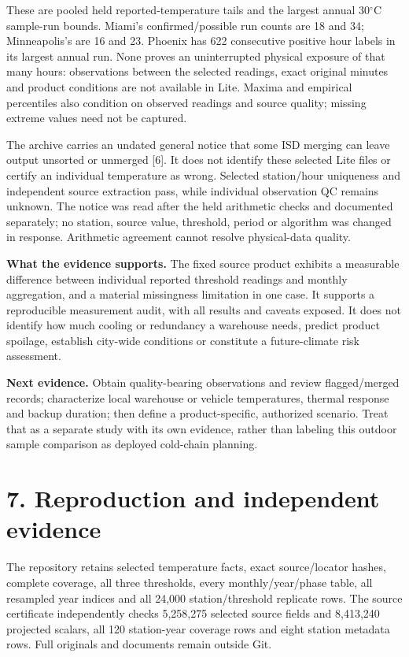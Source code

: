 \documentclass[10pt,letterpaper]{article}
\begin{document}
These are pooled held reported-temperature tails and the largest annual 30$^{\circ}$C sample-run bounds. Miami's confirmed/possible run counts are 18 and 34; Minneapolis's are 16 and 23. Phoenix has 622 consecutive positive hour labels in its largest annual run. None proves an uninterrupted physical exposure of that many hours: observations between the selected readings, exact original minutes and product conditions are not available in Lite. Maxima and empirical percentiles also condition on observed readings and source quality; missing extreme values need not be captured.

The archive carries an undated general notice that some ISD merging can leave output unsorted or unmerged [6]. It does not identify these selected Lite files or certify an individual temperature as wrong. Selected station/hour uniqueness and independent source extraction pass, while individual observation QC remains unknown. The notice was read after the held arithmetic checks and documented separately; no station, source value, threshold, period or algorithm was changed in response. Arithmetic agreement cannot resolve physical-data quality.

\textbf{What the evidence supports.} The fixed source product exhibits a measurable difference between individual reported threshold readings and monthly aggregation, and a material missingness limitation in one case. It supports a reproducible measurement audit, with all results and caveats exposed. It does not identify how much cooling or redundancy a warehouse needs, predict product spoilage, establish city-wide conditions or constitute a future-climate risk assessment.

\textbf{Next evidence.} Obtain quality-bearing observations and review flagged/merged records; characterize local warehouse or vehicle temperatures, thermal response and backup duration; then define a product-specific, authorized scenario. Treat that as a separate study with its own evidence, rather than labeling this outdoor sample comparison as deployed cold-chain planning.

\clearpage
\section*{7. Reproduction and independent evidence}
The repository retains selected temperature facts, exact source/locator hashes, complete coverage, all three thresholds, every monthly/year/phase table, all resampled year indices and all 24,000 station/threshold replicate rows. The source certificate independently checks 5,258,275 selected source fields and 8,413,240 projected scalars, all 120 station-year coverage rows and eight station metadata rows. Full originals and documents remain outside Git.
\end{document}
